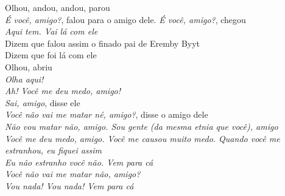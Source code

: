 \begin{linenumbers}\begingroup\raggedright
 
\noindent   Olhou, andou, andou, parou\\
  \emph{É você, amigo?}, falou para o amigo dele. \emph{É você, amigo?}, chegou\\
  \emph{Aqui tem.  Vai lá com ele}\\
  Dizem que falou assim o finado pai de Eremby Byyt\\
  Dizem que foi lá com ele\\
  Olhou, abriu\\
  \emph{Olha aqui!}\\
  \emph{Ah! Você me deu medo, amigo!}\\
  \emph{Sai, amigo}, disse ele\\
  \emph{Você não vai me matar né, amigo?}, disse o amigo dele\\
  \emph{Não vou matar não, amigo. Sou gente (da mesma etnia que você), amigo}\\
  \emph{Você me deu medo, amigo. Você me causou muito medo. Quando você me estranhou, eu fiquei assim}\\
  \emph{Eu não estranho você não. Vem para cá}\\
  \emph{Você não vai me matar não, amigo?}\\
  \emph{Vou nada! Vou nada! Vem para cá}
 
\end{linenumbers}\endgroup

